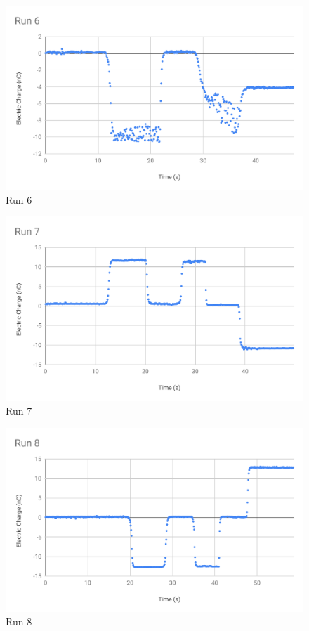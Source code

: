\begin{figure}[ht]
	\centering
	\includegraphics[scale=0.74]{image/01-electro/Run6.pdf}
	\caption{Run 6}
	\label{figure.01.run.6}
\end{figure}
\begin{figure}[ht]
	\centering
	\includegraphics[scale=0.74]{image/01-electro/Run7.pdf}
	\caption{Run 7}
	\label{figure.01.run.7}
\end{figure}
\begin{figure}[ht]
	\centering
	\includegraphics[scale=0.74]{image/01-electro/Run8.pdf}
	\caption{Run 8}
	\label{figure.01.run.8}
\end{figure}
